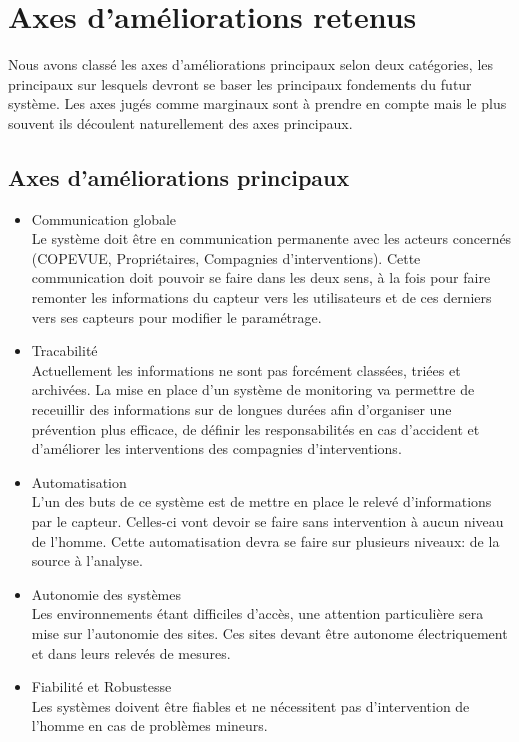 \section{Axes d'améliorations retenus}

Nous avons classé les axes d'améliorations principaux selon deux catégories, les principaux sur lesquels devront se baser les principaux fondements du futur système. Les axes jugés comme marginaux sont à prendre en compte mais le plus souvent ils découlent naturellement des axes principaux. 

\subsection{Axes d'améliorations principaux}

\begin{itemize}

	\item Communication globale \\
	Le système doit être en communication permanente avec les acteurs concernés (COPEVUE, Propriétaires, Compagnies d'interventions). Cette communication doit pouvoir se faire dans les deux sens, à la fois pour faire remonter les informations du capteur vers les utilisateurs et de ces derniers vers ses capteurs pour modifier le paramétrage. 

	\item Tracabilité \\
	Actuellement les informations ne sont pas forcément classées, triées et archivées. La mise en place d'un système de monitoring va permettre de receuillir des informations sur de longues durées afin d'organiser une prévention plus efficace, de définir les responsabilités en cas d'accident et d'améliorer les interventions des compagnies d'interventions.

	\item Automatisation \\
	L'un des buts de ce système est de mettre en place le relevé d'informations par le capteur. Celles-ci vont devoir se faire sans intervention à aucun niveau de l'homme. Cette automatisation devra se faire sur plusieurs niveaux: de la source à l'analyse. 
	
	\item Autonomie des systèmes \\
	Les environnements étant difficiles d'accès, une attention particulière sera mise sur l'autonomie des sites. Ces sites devant être autonome électriquement et dans leurs relevés de mesures.

	\item Fiabilité et Robustesse \\
	Les systèmes doivent être fiables et ne nécessitent pas d'intervention de l'homme en cas de problèmes mineurs.

\end{itemize}


